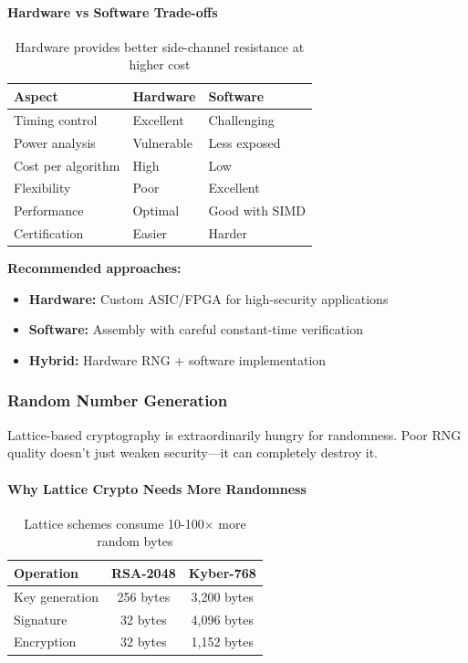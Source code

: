 \documentclass[11pt,a4paper]{article}
\begin{document}
\paragraph{Hardware vs Software Trade-offs}

\begin{table}[h]
\centering
\begin{tabular}{|l|l|l|}
\hline
\textbf{Aspect} & \textbf{Hardware} & \textbf{Software} \\
\hline
Timing control & Excellent & Challenging \\
Power analysis & Vulnerable & Less exposed \\
Cost per algorithm & High & Low \\
Flexibility & Poor & Excellent \\
Performance & Optimal & Good with SIMD \\
Certification & Easier & Harder \\
\hline
\end{tabular}
\caption{Hardware provides better side-channel resistance at higher cost}
\end{table}

\textbf{Recommended approaches:}
\begin{itemize}
    \item \textbf{Hardware:} Custom ASIC/FPGA for high-security applications
    \item \textbf{Software:} Assembly with careful constant-time verification
    \item \textbf{Hybrid:} Hardware RNG + software implementation
\end{itemize}

\subsubsection{Random Number Generation}

Lattice-based cryptography is extraordinarily hungry for randomness. Poor RNG quality doesn't just weaken security—it can completely destroy it.

\paragraph{Why Lattice Crypto Needs More Randomness}

\begin{table}[h]
\centering
\begin{tabular}{|l|c|c|}
\hline
\textbf{Operation} & \textbf{RSA-2048} & \textbf{Kyber-768} \\
\hline
Key generation & 256 bytes & 3,200 bytes \\
Signature & 32 bytes & 4,096 bytes \\
Encryption & 32 bytes & 1,152 bytes \\
\hline
\end{tabular}
\caption{Lattice schemes consume 10-100× more random bytes}
\end{table}
\end{document}
